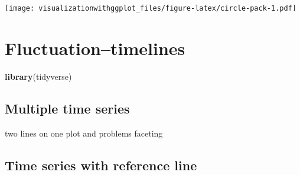 \documentclass[]{krantz}
\makeatletter
\newenvironment{Shaded}{\begin{snugshade}}{\end{snugshade}}
\newcommand{\KeywordTok}[1]{\textcolor[rgb]{0.13,0.29,0.53}{\textbf{#1}}}
\newcommand{\NormalTok}[1]{#1}
\newenvironment{kframe}{%
\medskip{}
\setlength{\fboxsep}{.8em}
 \def\at@end@of@kframe{}%
 \ifinner\ifhmode%
  \def\at@end@of@kframe{\end{minipage}}%
  \begin{minipage}{\columnwidth}%
 \fi\fi%
 \def\FrameCommand##1{\hskip\@totalleftmargin \hskip-\fboxsep
 \colorbox{shadecolor}{##1}\hskip-\fboxsep
     \hskip-\linewidth \hskip-\@totalleftmargin \hskip\columnwidth}%
 \MakeFramed {\advance\hsize-\width
   \@totalleftmargin\z@ \linewidth\hsize
   \@setminipage}}%
 {\par\unskip\endMakeFramed%
 \at@end@of@kframe}
\renewenvironment{Shaded}{\begin{kframe}}{\end{kframe}}
\makeatother
\begin{document}
\texttt{[image: visualizationwithggplot\_files/figure-latex/circle-pack-1.pdf]}

\cleardoublepage

\hypertarget{Fluctuation}{%
\chapter{Fluctuation--timelines}\label{Fluctuation}}

\begin{Shaded}
\begin{Highlighting}[]
\KeywordTok{library}\NormalTok{(tidyverse)}
\end{Highlighting}
\end{Shaded}

\hypertarget{multiple-time-series}{%
\section{Multiple time series}\label{multiple-time-series}}

two lines on one plot and problems
faceting

\hypertarget{time-series-with-reference-line}{%
\section{Time series with reference line}\label{time-series-with-reference-line}}
\end{document}
